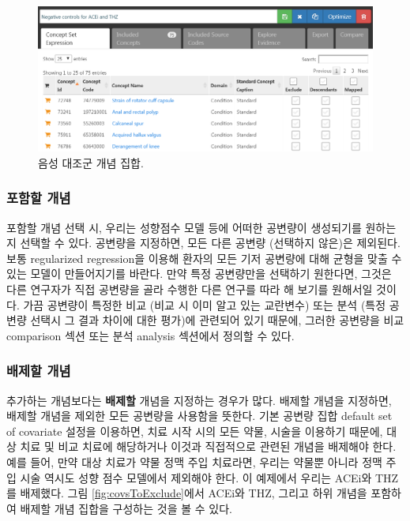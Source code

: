 \documentclass[10.5pt]{book}
\theoremstyle{definition}
\theoremstyle{definition}
\theoremstyle{definition}
\theoremstyle{remark}
\begin{document}
\begin{figure}

{\centering \includegraphics[width=1\linewidth]{images/PopulationLevelEstimation/ncConceptSet} 

}

\caption{음성 대조군 개념 집합.}\label{fig:ncConceptSet}
\end{figure}

\subsubsection*{포함할 개념}\label{-}

포함할 개념 선택 시, 우리는 성향점수 모델 등에 어떠한 공변량이
생성되기를 원하는지 선택할 수 있다. 공변량을 지정하면, 모든 다른 공변량
(선택하지 않은)은 제외된다. 보통 regularized regression을 이용해 환자의
모든 기저 공변량에 대해 균형을 맞출 수 있는 모델이 만들어지기를 바란다.
만약 특정 공변량만을 선택하기 원한다면, 그것은 다른 연구자가 직접
공변량을 골라 수행한 다른 연구를 따라 해 보기를 원해서일 것이다. 가끔
공변량이 특정한 비교 (비교 시 이미 알고 있는 교란변수) 또는 분석 (특정
공변량 선택시 그 결과 차이에 대한 평가)에 관련되어 있기 때문에, 그러한
공변량을 비교 comparison 섹션 또는 분석 analysis 섹션에서 정의할 수
있다.

\subsubsection*{배제할 개념}\label{-}

추가하는 개념보다는 \textbf{배제할} 개념을 지정하는 경우가 많다. 배제할
개념을 지정하면, 배제할 개념을 제외한 모든 공변량을 사용함을 뜻한다.
기본 공변량 집합 default set of covariate 설정을 이용하면, 치료 시작
시의 모든 약물, 시술을 이용하기 때문에, 대상 치료 및 비교 치료에
해당하거나 이것과 직접적으로 관련된 개념을 배제해야 한다. 예를 들어,
만약 대상 치료가 약물 정맥 주입 치료라면, 우리는 약물뿐 아니라 정맥 주입
시술 역시도 성향 점수 모델에서 제외해야 한다. 이 예제에서 우리는 ACEi와
THZ를 배제했다. 그림 \ref{fig:covsToExclude}에서 ACEi와 THZ, 그리고 하위
개념을 포함하여 배제할 개념 집합을 구성하는 것을 볼 수 있다.
\end{document}
